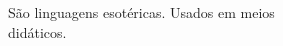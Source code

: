 \documentclass[preview]{standalone}
\begin{document}
São linguagens esotéricas. Usados em meios\\ didáticos.\\
\end{document}
